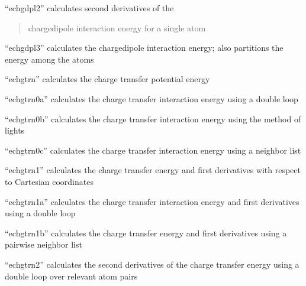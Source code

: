 \documentclass[letterpaper,11pt,english]{sphinxmanual}
\begin{document}
\sphinxAtStartPar
{}

\sphinxAtStartPar
“echgdpl2” calculates second derivatives of the
\begin{quote}

\sphinxAtStartPar
charge\sphinxhyphen{}dipole interaction energy for a single atom
\end{quote}

\sphinxAtStartPar
{}

\sphinxAtStartPar
“echgdpl3” calculates the charge\sphinxhyphen{}dipole interaction energy; also partitions the energy among the atoms

\sphinxAtStartPar
{}

\sphinxAtStartPar
“echgtrn” calculates the charge transfer potential energy

\sphinxAtStartPar
{}

\sphinxAtStartPar
“echgtrn0a” calculates the charge transfer interaction energy using a double loop

\sphinxAtStartPar
{}

\sphinxAtStartPar
“echgtrn0b” calculates the charge transfer interaction energy using the method of lights

\sphinxAtStartPar
{}

\sphinxAtStartPar
“echgtrn0c” calculates the charge transfer interaction energy using a neighbor list

\sphinxAtStartPar
{}

\sphinxAtStartPar
“echgtrn1” calculates the charge transfer energy and first derivatives with respect to Cartesian coordinates

\sphinxAtStartPar
{}

\sphinxAtStartPar
“echgtrn1a” calculates the charge transfer interaction energy and first derivatives using a double loop

\sphinxAtStartPar
{}

\sphinxAtStartPar
“echgtrn1b” calculates the charge transfer energy and first derivatives using a pairwise neighbor list

\sphinxAtStartPar
{}

\sphinxAtStartPar
“echgtrn2” calculates the second derivatives of the charge transfer energy using a double loop over relevant atom pairs
\end{document}
